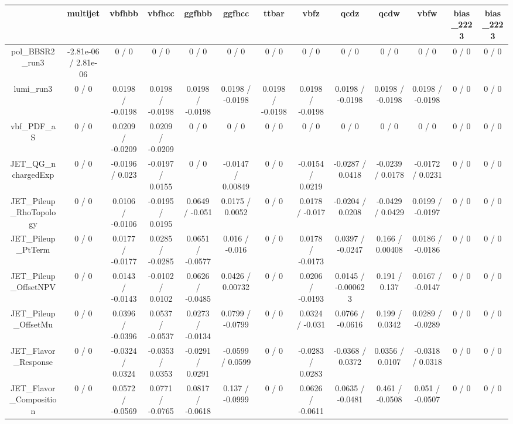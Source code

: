 \documentclass[10pt]{article}
\begin{document}
\begin{table}[htbp]
\begin{center}
\begin{tabular}{|c|c|c|c|c|c|c|c|c|c|c|c|c|}
\hline 
      & multijet      & vbfhbb      & vbfhcc      & ggfhbb      & ggfhcc      & ttbar      & vbfz      & qcdz      & qcdw      & vbfw      & bias_2223      & bias_2223 \\ 
\hline 
  pol_BBSR2_run3 & -2.81e-06 / 2.81e-06 & 0 / 0 & 0 / 0 & 0 / 0 & 0 / 0 & 0 / 0 & 0 / 0 & 0 / 0 & 0 / 0 & 0 / 0 & 0 / 0 & 0 / 0 \\ 
  lumi_run3 & 0 / 0 & 0.0198 / -0.0198 & 0.0198 / -0.0198 & 0.0198 / -0.0198 & 0.0198 / -0.0198 & 0.0198 / -0.0198 & 0.0198 / -0.0198 & 0.0198 / -0.0198 & 0.0198 / -0.0198 & 0.0198 / -0.0198 & 0 / 0 & 0 / 0 \\ 
  vbf_PDF_aS & 0 / 0 & 0.0209 / -0.0209 & 0.0209 / -0.0209 & 0 / 0 & 0 / 0 & 0 / 0 & 0 / 0 & 0 / 0 & 0 / 0 & 0 / 0 & 0 / 0 & 0 / 0 \\ 
  JET_QG_nchargedExp & 0 / 0 & -0.0196 / 0.023 & -0.0197 / 0.0155 & 0 / 0 & -0.0147 / 0.00849 & 0 / 0 & -0.0154 / 0.0219 & -0.0287 / 0.0418 & -0.0239 / 0.0178 & -0.0172 / 0.0231 & 0 / 0 & 0 / 0 \\ 
  JET_Pileup_RhoTopology & 0 / 0 & 0.0106 / -0.0106 & -0.0195 / 0.0195 & 0.0649 / -0.051 & 0.0175 / 0.0052 & 0 / 0 & 0.0178 / -0.017 & -0.0204 / 0.0208 & -0.0429 / 0.0429 & 0.0199 / -0.0197 & 0 / 0 & 0 / 0 \\ 
  JET_Pileup_PtTerm & 0 / 0 & 0.0177 / -0.0177 & 0.0285 / -0.0285 & 0.0651 / -0.0577 & 0.016 / -0.016 & 0 / 0 & 0.0178 / -0.0173 & 0.0397 / -0.0247 & 0.166 / 0.00408 & 0.0186 / -0.0186 & 0 / 0 & 0 / 0 \\ 
  JET_Pileup_OffsetNPV & 0 / 0 & 0.0143 / -0.0143 & -0.0102 / 0.0102 & 0.0626 / -0.0485 & 0.0426 / 0.00732 & 0 / 0 & 0.0206 / -0.0193 & 0.0145 / -0.000623 & 0.191 / 0.137 & 0.0167 / -0.0147 & 0 / 0 & 0 / 0 \\ 
  JET_Pileup_OffsetMu & 0 / 0 & 0.0396 / -0.0396 & 0.0537 / -0.0537 & 0.0273 / -0.0134 & 0.0799 / -0.0799 & 0 / 0 & 0.0324 / -0.031 & 0.0766 / -0.0616 & 0.199 / 0.0342 & 0.0289 / -0.0289 & 0 / 0 & 0 / 0 \\ 
  JET_Flavor_Response & 0 / 0 & -0.0324 / 0.0324 & -0.0353 / 0.0353 & -0.0291 / 0.0291 & -0.0599 / 0.0599 & 0 / 0 & -0.0283 / 0.0283 & -0.0368 / 0.0372 & 0.0356 / 0.0107 & -0.0318 / 0.0318 & 0 / 0 & 0 / 0 \\ 
  JET_Flavor_Composition & 0 / 0 & 0.0572 / -0.0569 & 0.0771 / -0.0765 & 0.0817 / -0.0618 & 0.137 / -0.0999 & 0 / 0 & 0.0626 / -0.0611 & 0.0635 / -0.0481 & 0.461 / -0.0508 & 0.051 / -0.0507 & 0 / 0 & 0 / 0 \\ 

\end{tabular}
\end{center}
\end{table}
\end{document}
